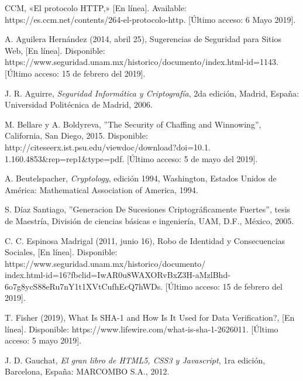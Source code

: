 \documentclass[12pt, a4paper, titlepage]{report}
\begin{document}
	\newpage

    \begin{thebibliography}{20}
         CCM, «El protocolo HTTP,» [En línea]. Available: https://es.ccm.net/contents/264-el-protocolo-http. [Último acceso: 6 Mayo 2019].
	
		A. Aguilera Hernández (2014, abril 25), Sugerencias de Seguridad para Sitios Web, [En línea]. Disponible: https://www.seguridad.unam.mx/historico/documento/index.html-id=1143. [Último acceso: 15 de febrero del 2019].
	    
        J. R. Aguirre, \textit{Seguridad Informática y Criptografía}, 2da edición, Madrid, España: Universidad Politécnica de Madrid, 2006.
	    
		M. Bellare y A. Boldyreva, ''The Security of Chaffing and Winnowing'', California, San Diego, 2015. Disponible: http://citeseerx.ist.psu.edu/viewdoc/download?doi=10.1.\\1.160.4853\&rep=rep1\&type=pdf. [Último acceso: 5 de mayo del 2019].
	
		A. Beutelspacher, \textit{Cryptology}, edición 1994, Washington, Estados Unidos de América: Mathematical Association of America, 1994.
		
        S. Díaz Santiago, ''Generacion De Sucesiones Criptográficamente Fuertes'', tesis de Maestría, División de ciencias básicas e ingeniería, UAM, D.F., México, 2005.
		
		C. C. Espinosa Madrigal (2011, junio 16), Robo de Identidad y Consecuencias Sociales, [En línea]. Disponible: https://www.seguridad.unam.mx/historico/documento/\\index.html-id=16?fbclid=IwAR0u8WAXORvBxZ3H-aMzlBhd-6o7g8ycS88eRu7nY1t1XVtCufhEcQ7hWDs. [Último acceso: 15 de febrero del 2019].
		
        T. Fisher (2019), What Is SHA-1 and How Is It Used for Data Verification?, [En línea]. Disponible: https://www.lifewire.com/what-is-sha-1-2626011. [Último acceso: 5 mayo 2019].
		
		J. D. Gauchat, \textit{El gran libro de HTML5, CSS3 y Javascript}, 1ra edición, Barcelona, España: MARCOMBO S.A., 2012. 
		

\end{thebibliography}
\end{document}
